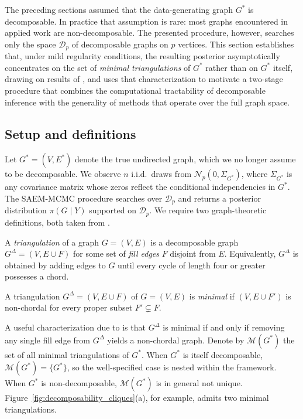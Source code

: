 The preceding sections assumed that the data-generating graph $G^*$ is decomposable. In practice that assumption is rare: most graphs encountered in applied work are non-decomposable. The presented procedure, however, searches only the space $\mathcal{D}_p$ of decomposable graphs on $p$ vertices. This section establishes that, under mild regularity conditions, the resulting posterior asymptotically concentrates on the set of \textit{minimal triangulations} of $G^*$ rather than on $G^*$ itself, drawing on results of \textcite{niu2020bayesian}, and uses that characterization to motivate a two-stage procedure that combines the computational tractability of decomposable inference with the generality of methods that operate over the full graph space.

\subsection{Setup and definitions}

Let $G^* = (V, E^*)$ denote the true undirected graph, which we no longer assume to be decomposable. We observe $n$ i.i.d.\ draws from $\mathcal{N}_p(0, \Sigma_{G^*})$, where $\Sigma_{G^*}$ is any covariance matrix whose zeros reflect the conditional independencies in $G^*$. The SAEM-MCMC procedure searches over $\mathcal{D}_p$ and returns a posterior distribution $\pi(G \mid Y)$ supported on $\mathcal{D}_p$. We require two graph-theoretic definitions, both taken from \textcite{heggernes2006minimal}.

\begin{definition}[Triangulation]
    A \textit{triangulation} of a graph $G = (V, E)$ is a decomposable graph $G^\Delta = (V, E \cup F)$ for some set of \textit{fill edges} $F$ disjoint from $E$. Equivalently, $G^\Delta$ is obtained by adding edges to $G$ until every cycle of length four or greater possesses a chord.
\end{definition}

\begin{definition}
    A triangulation $G^\Delta = (V, E \cup F)$ of $G = (V, E)$ is \textit{minimal} if $(V, E \cup F')$ is non-chordal for every proper subset $F' \subsetneq F$.
\end{definition}

A useful characterization due to \textcite{rose1976algorithmic} is that $G^\Delta$ is minimal if and only if removing any single fill edge from $G^\Delta$ yields a non-chordal graph. Denote by $\mathcal{M}(G^*)$ the set of all minimal triangulations of $G^*$. When $G^*$ is itself decomposable, $\mathcal{M}(G^*) = \{G^*\}$, so the well-specified case is nested within the framework. When $G^*$ is non-decomposable, $\mathcal{M}(G^*)$ is in general not unique. Figure~\ref{fig:decomposability_cliques}(a), for example, admits two minimal triangulations.

